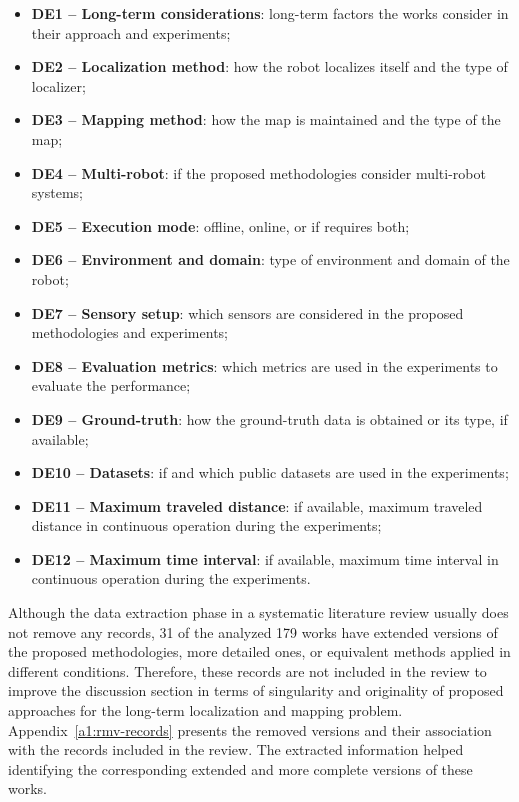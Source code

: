 \documentclass[10pt,a4paper,notitlepage,twocolumn,oneside]{article}
\begin{document}
\begin{itemize}\setlength\itemsep{-0.5em}
\item \textbf{DE1 -- Long-term considerations}: long-term factors the works consider in their approach and experiments;
\item \textbf{DE2 -- Localization method}: how the robot localizes itself and the type of localizer;
\item \textbf{DE3 -- Mapping method}: how the map is maintained and the type of the map;
\item \textbf{DE4 -- Multi-robot}: if the proposed methodologies consider multi-robot systems;
\item \textbf{DE5 -- Execution mode}: offline, online, or if requires both;
\item \textbf{DE6 -- Environment and domain}: type of environment and domain of the robot;
\item \textbf{DE7 -- Sensory setup}: which sensors are considered in the proposed methodologies and experiments;
\item \textbf{DE8 -- Evaluation metrics}: which metrics are used in the experiments to evaluate the performance;
\item \textbf{DE9 -- Ground-truth}: how the ground-truth data is obtained or its type, if available;
\item \textbf{DE10 -- Datasets}: if and which public datasets are used in the experiments;
\item \textbf{DE11 -- Maximum traveled distance}: if available, maximum traveled distance in continuous operation during the experiments;
\item \textbf{DE12 -- Maximum time interval}: if available, maximum time interval in continuous operation during the experiments.
\end{itemize}

Although the data extraction phase in a systematic literature review usually does not remove any records, 31 of the analyzed 179 works have extended versions of the proposed methodologies, more detailed ones, or equivalent methods applied in different conditions.
Therefore, these records are not included in the review to improve the discussion section in terms of singularity and originality of proposed approaches for the long-term localization and mapping problem.
Appendix~\ref{a1:rmv-records} presents the removed versions and their association with the records included in the review. The extracted information helped identifying the corresponding extended and more complete versions of these works.
\end{document}
